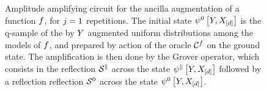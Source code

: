 \begin{example}
\begin{figure}
\begin{center}
\begin{tikzpicture}[scale=0.35, thick]
            \end{tikzpicture}
        \end{center}
        \caption{Amplitude amplifying circuit for the ancilla augmentation of a function $f$, for $j=1$ repetitions.
        The initial state $\psi^{0}\left[Y,X_{[d]}\right]$ is the q-sample of the by $Y$ augmented uniform distributions among the models of $f$, and prepared by action of the oracle $\mathcal{C}^{f}$ on the ground state.
        The amplification is then done by the Grover operator, which consists in the reflection $\mathcal{S}^{\parallel}$ across the state $\psi^{\parallel}\left[Y,X_{[d]}\right]$ followed by a reflection reflection $\mathcal{S}^{0}$ across the state $\psi^{0}\left[Y,X_{[d]}\right]$.}
        \label{fig:formulaAmplificationCircuit}
    \end{figure}
\end{example}